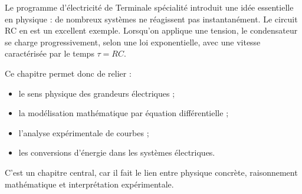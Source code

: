 \documentclass[11pt,a4paper]{article}
\begin{document}
Le programme d'électricité de Terminale spécialité introduit une idée essentielle en physique : de nombreux systèmes ne réagissent pas instantanément. Le circuit RC en est un excellent exemple. Lorsqu'on applique une tension, le condensateur se charge progressivement, selon une loi exponentielle, avec une vitesse caractérisée par le temps \(\tau = RC\).

Ce chapitre permet donc de relier :
\begin{itemize}
    \item le sens physique des grandeurs électriques ;
    \item la modélisation mathématique par équation différentielle ;
    \item l'analyse expérimentale de courbes ;
    \item les conversions d'énergie dans les systèmes électriques.
\end{itemize}

C'est un chapitre central, car il fait le lien entre physique concrète, raisonnement mathématique et interprétation expérimentale.
\end{document}
